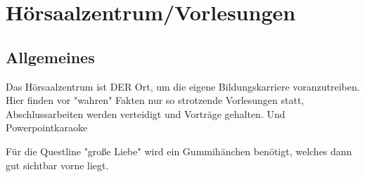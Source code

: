 \section{Hörsaalzentrum/Vorlesungen}
\subsection{Allgemeines}
Das Hörsaalzentrum ist DER Ort, um die eigene Bildungskarriere voranzutreiben. Hier finden vor "wahren" Fakten nur so strotzende Vorlesungen statt, Abschlussarbeiten werden verteidigt und Vorträge gehalten. Und Powerpointkaraoke

Für die Questline "große Liebe" wird ein Gummihänchen benötigt, welches dann gut sichtbar vorne liegt.